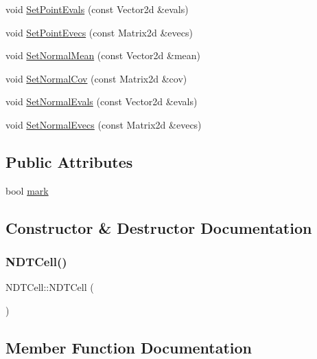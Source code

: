 \begin{DoxyCompactItemize}
\item 
void \hyperlink{classNDTCell_a4293e58ef5d4854c498ea0ad106814f7}{Set\+Point\+Evals} (const Vector2d \&evals)
\item 
void \hyperlink{classNDTCell_a6737cd9418e06edc8bf4b30a1ae19878}{Set\+Point\+Evecs} (const Matrix2d \&evecs)
\item 
void \hyperlink{classNDTCell_aa4ae332c7e61006d4690921ae8882d1b}{Set\+Normal\+Mean} (const Vector2d \&mean)
\item 
void \hyperlink{classNDTCell_a18ac3bd685318520b21bd015e8c94ef3}{Set\+Normal\+Cov} (const Matrix2d \&cov)
\item 
void \hyperlink{classNDTCell_a345105fcf5addd6802e4769619e3532d}{Set\+Normal\+Evals} (const Vector2d \&evals)
\item 
void \hyperlink{classNDTCell_ab2300ea06704e0dfb348ba31a5d4fc83}{Set\+Normal\+Evecs} (const Matrix2d \&evecs)
\end{DoxyCompactItemize}
\subsection*{Public Attributes}
\begin{DoxyCompactItemize}
\item 
bool \hyperlink{classNDTCell_ae2c7aeea3860e92433adc72d108d65b4}{mark}
\end{DoxyCompactItemize}


\subsection{Constructor \& Destructor Documentation}
\mbox{\label{classNDTCell_acfc90537523f63170f002f74d7db1bd5}} 
\subsubsection{\texorpdfstring{N\+D\+T\+Cell()}{NDTCell()}}
{\footnotesize\ttfamily N\+D\+T\+Cell\+::\+N\+D\+T\+Cell (\begin{DoxyParamCaption}{ }\end{DoxyParamCaption})}



\subsection{Member Function Documentation}
\mbox{\label{classNDTCell_ada906677c0bf7f0c614bce81c4493425}} 
